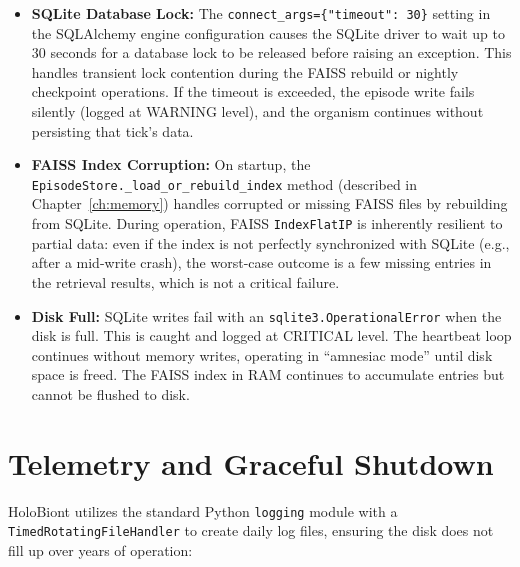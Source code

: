 \begin{itemize}
    \item \textbf{SQLite Database Lock:} The \texttt{connect\_args=\{"timeout": 30\}} setting in the SQLAlchemy engine configuration causes the SQLite driver to wait up to 30 seconds for a database lock to be released before raising an exception. This handles transient lock contention during the FAISS rebuild or nightly checkpoint operations. If the timeout is exceeded, the episode write fails silently (logged at WARNING level), and the organism continues without persisting that tick's data.

    \item \textbf{FAISS Index Corruption:} On startup, the \texttt{EpisodeStore.\_load\_or\_rebuild\_index} method (described in Chapter~\ref{ch:memory}) handles corrupted or missing FAISS files by rebuilding from SQLite. During operation, FAISS \texttt{IndexFlatIP} is inherently resilient to partial data: even if the index is not perfectly synchronized with SQLite (e.g., after a mid-write crash), the worst-case outcome is a few missing entries in the retrieval results, which is not a critical failure.

    \item \textbf{Disk Full:} SQLite writes fail with an \texttt{sqlite3.OperationalError} when the disk is full. This is caught and logged at CRITICAL level. The heartbeat loop continues without memory writes, operating in ``amnesiac mode'' until disk space is freed. The FAISS index in RAM continues to accumulate entries but cannot be flushed to disk.
\end{itemize}

\section{Telemetry and Graceful Shutdown}

HoloBiont utilizes the standard Python \texttt{logging} module with a \texttt{TimedRotatingFileHandler} to create daily log files, ensuring the disk does not fill up over years of operation:

